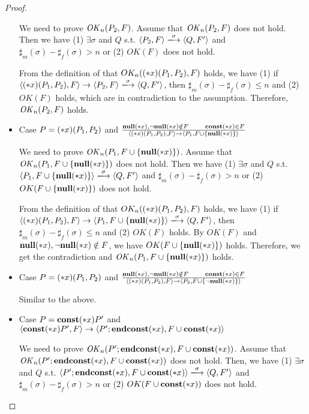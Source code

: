 \begin{proof}
\begin{itemize}
  We need to prove \(\mathit{OK}_n(P_2, F)\).  Assume that \(\mathit{OK}_n(P_2, F)\)
  does not hold. Then we have (1) \( \exists \sigma \) and \(Q\)
  s.t. \( \langle P_2, F \rangle \xlongrightarrow{\sigma} \langle Q,
  F' \rangle \) and \(\sharp_{m}(\sigma) - \sharp_{f}(\sigma) > n\) or
  (2) \( OK(F)\) does not hold.

  From the definition of that \(OK_n((*x)(P_1, P_2), F)\) holds, we
  have (1) if \( \langle \Sirx(P_1, P_2), F \rangle \rightarrow
  \langle P_2, F \rangle \xlongrightarrow{\sigma} \langle Q, F'
  \rangle \), then \(\sharp_m(\sigma) -
  \sharp_f(\sigma) \le n \) and (2) \(OK(F)\) holds, which are in
  contradiction to the assumption.  Therefore, \(\mathit{OK}_n(P_2, F)\)
  holds.

 \item Case \( P = (*x)(P_1,P_2) \) and \( \frac{ {\bf null}(*x),\neg{\bf null}(*x) \notin F
  \quad\quad \mathbf{const}(*x) \in F} { \langle (*x)(P_1, P_2), F \rangle
  \rightarrow \langle P_1, F\cup\{{\bf null}(*x)\} \rangle } \)

  We need to prove \(\mathit{OK}_n(P_1, F\cup\{{\bf null}(*x)\})\).  Assume that
  \(\mathit{OK}_n(P_1, F\cup\{{\bf null}(*x)\})\) does not hold. Then we have (1) \(
  \exists \sigma \) and \(Q\) s.t. \( \langle P_1, F\cup\{\snull\}
  \rangle \xlongrightarrow{\sigma} \langle Q, F' \rangle \) and
  \(\sharp_{m}(\sigma) - \sharp_{f}(\sigma) > n\) or (2) \(
  OK(F\cup\{{\bf null}(*x)\})\) does not hold.

  From the definition of that \(OK_n((*x)(P_1, P_2), F)\) holds, we
  have (1) if \( \langle \Sirx(P_1, P_2), F \rangle \rightarrow
  \langle P_1, F\cup\{\snull\} \rangle \xlongrightarrow{\sigma}
  \langle Q, F' \rangle \), then \(\sharp_m(\sigma) - \sharp_f(\sigma)
  \le n \) and (2) \(OK(F)\) holds. By \(OK(F)\) and \({\bf null}(*x), \neg{\bf null}(*x)
  \notin F \), we have \(OK(F\cup\{{\bf null}(*x)\})\) holds.  Therefore, we
  get the contradiction and \(\mathit{OK}_n(P_1, F\cup\{{\bf null}(*x)\})\) holds.

\item Case \( P = (*x)(P_1,P_2) \) and \( \frac{ {\bf null}(*x),\neg{\bf null}(*x) \notin F
  \quad\quad \mathbf{const}(*x) \in F} { \langle (*x)(P_1, P_2), F \rangle
  \rightarrow \langle P_2, F\cup\{\neg{\bf null}(*x)\} \rangle } \)

  Similar to the above.
  
\item Case \( P = \mathbf{const}(*x) P' \) and \( \langle \mathbf{const}(*x) P', F \rangle
  \rightarrow \langle P';\mathbf{endconst}(*x), F\cup{\mathbf{const}(*x)} \rangle  \)

  We need to prove \(\mathit{OK}_n(P';\mathbf{endconst}(*x), F\cup{\mathbf{const}(*x)})\).  Assume
  that \(\mathit{OK}_n(P';\mathbf{endconst}(*x), F\cup{\mathbf{const}(*x)})\) does not hold. Then,
  we have (1) \( \exists \sigma \) and \(Q\) s.t. \( \langle
  P';\Endconst, F\cup{\scon\Sirx} \rangle \xlongrightarrow{\sigma}
  \langle Q, F' \rangle \) and \(\sharp_{m}(\sigma) -
  \sharp_{f}(\sigma) > n\) or (2) \( OK(F\cup{\mathbf{const}(*x)})\) does not
  hold.


\end{itemize}
\end{proof}
